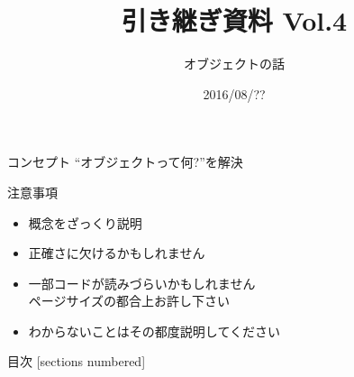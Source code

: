 \documentclass[12pt, xetex, xcolor=pdftex, dvipsnames]{beamer}
\title{引き継ぎ資料 Vol.4}
\subtitle{オブジェクトの話}
\date{2016/08/??}
\author{}
\institute{}
\begin{document}
\maketitle
\begin{frame}{コンセプト}
    ``オブジェクトって何?''を解決
\end{frame}
\begin{frame}{注意事項}
    \begin{itemize}
        \item 概念をざっくり説明
        \item 正確さに欠けるかもしれません
        \item 一部コードが読みづらいかもしれません\\
            ページサイズの都合上お許し下さい
        \item わからないことはその都度説明してください
    \end{itemize}
\end{frame}
\begin{frame}{目次}
  [sections numbered]
  \tableofcontents[hideallsubsections]
\end{frame}
\end{document}
